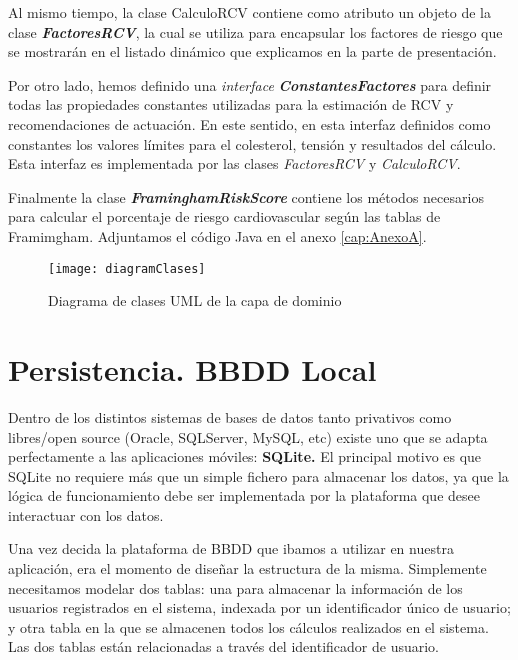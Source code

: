 Al mismo tiempo, la clase CalculoRCV contiene como atributo un objeto de la clase \textbf{\emph{FactoresRCV}}, la cual se utiliza para encapsular los factores de riesgo que se mostrarán en el listado dinámico que explicamos en la parte de presentación.


Por otro lado, hemos definido una \emph{interface} \textbf{\emph{ConstantesFactores}} para definir todas las propiedades constantes utilizadas para la estimación de RCV y recomendaciones de actuación. En este sentido, en esta interfaz definidos como constantes los valores límites para el colesterol, tensión y resultados del cálculo. Esta interfaz es implementada por las clases \emph{FactoresRCV} y \emph{CalculoRCV}.

Finalmente la clase \emph{\textbf{FraminghamRiskScore}} contiene los métodos necesarios para calcular el porcentaje de riesgo cardiovascular según las tablas de Framimgham. Adjuntamos el código Java en el anexo \ref{cap:AnexoA}.


\begin{figure}[H]
	\centering
	\texttt{[image: diagramClases]} 
	\caption[Diagrama de clases]{Diagrama de clases UML de la capa de dominio
	}
	\label{fig:diagramaClases}
\end{figure}

\pagebreak



\section {Persistencia. BBDD Local}
Dentro de los distintos sistemas de bases de datos tanto privativos como libres/open source (Oracle, SQLServer, MySQL, etc) existe uno que se adapta perfectamente a las aplicaciones móviles:\textbf{ SQLite.} El principal motivo es que SQLite no requiere más que un simple fichero para almacenar los datos, ya que la lógica de funcionamiento debe ser implementada por la plataforma que desee interactuar con los datos.

\noindent Una vez decida la plataforma de BBDD que ibamos a utilizar en nuestra aplicación, era el momento de diseñar la estructura de la misma. Simplemente necesitamos modelar dos tablas: una para almacenar la información de los usuarios registrados en el sistema, indexada por un identificador único de usuario; y otra tabla en la que se almacenen todos los cálculos realizados en el sistema. Las dos tablas están relacionadas a través del identificador de usuario. 

